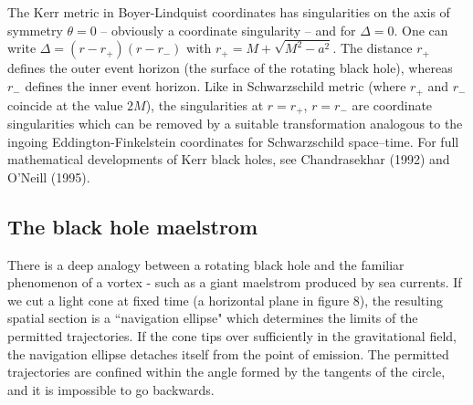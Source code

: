 \documentclass[12pt]{article}
\begin{document}
The Kerr metric in Boyer-Lindquist coordinates has singularities on the axis
of symmetry $\theta = 0$ -- obviously a coordinate singularity -- and for $\Delta
= 0$. One can write $\Delta = (r-r_+)(r-r_-)$ with $r_+ = M +\sqrt{M^2 -
a^2}$. The distance $r_+$ defines the outer event horizon (the surface of the rotating
black hole), whereas $r_-$ defines the inner event horizon. 
Like in Schwarzschild metric (where $r_+$ and $r_-$ coincide at the value $2M$),
the singularities at $r=r_+$, $r=r_-$ are coordinate singularities which can be
removed by a suitable transformation analogous to the ingoing
Eddington-Finkelstein coordinates for Schwarzschild space--time. For full mathematical
developments of Kerr black holes, see Chandrasekhar (1992) and O'Neill (1995).
 
\subsection {The black hole maelstrom}

There is a deep analogy between a rotating black
hole and the familiar phenomenon of a vortex - such as a giant
maelstrom produced by sea currents. If we cut a light cone at fixed time (a
horizontal plane in figure 8), the resulting spatial section is a
``navigation ellipse" which determines the limits of the permitted
trajectories. If the cone tips over sufficiently in the gravitational
field, the navigation ellipse detaches itself from the point of emission. The
permitted trajectories are confined within the angle formed by the
tangents of the circle, and it is impossible to go backwards. 
    
\end{document}
